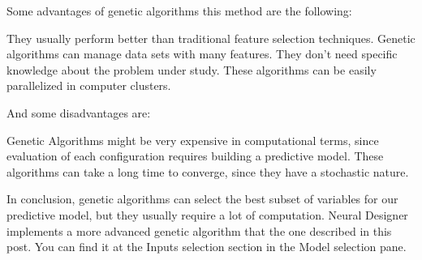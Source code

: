 \documentclass[a0paper,portrait]{baposter}
\begin{document}
\begin{poster}
{    Some advantages of genetic algorithms this method are the following:

        They usually perform better than traditional feature selection techniques.
        Genetic algorithms can manage data sets with many features.
        They don't need specific knowledge about the problem under study.
        These algorithms can be easily parallelized in computer clusters.

    And some disadvantages are:

        Genetic Algorithms might be very expensive in computational terms,
        since evaluation of each configuration requires building a predictive model.
        These algorithms can take a long time to converge,
        since they have a stochastic nature.

    In conclusion,
        genetic algorithms can select the best subset of variables for our predictive model,
        but they usually require a lot of computation.
    Neural Designer implements a more advanced genetic algorithm that the one described in this post.
    You can find it at the Inputs selection section in the Model selection pane.


}



\end{poster}
\end{document}
